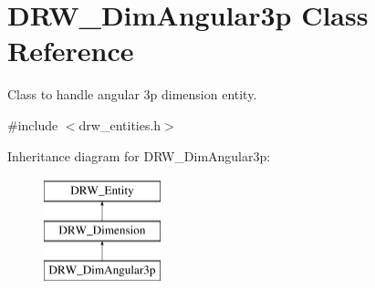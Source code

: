 \hypertarget{classDRW__DimAngular3p}{\section{D\-R\-W\-\_\-\-Dim\-Angular3p Class Reference}
\label{classDRW__DimAngular3p}
}


Class to handle angular 3p dimension entity.  




{\ttfamily \#include $<$drw\-\_\-entities.\-h$>$}

Inheritance diagram for D\-R\-W\-\_\-\-Dim\-Angular3p\-:\begin{figure}[H]
\begin{center}
\leavevmode
\includegraphics[height=3.000000cm]{classDRW__DimAngular3p}
\end{center}
\end{figure}
